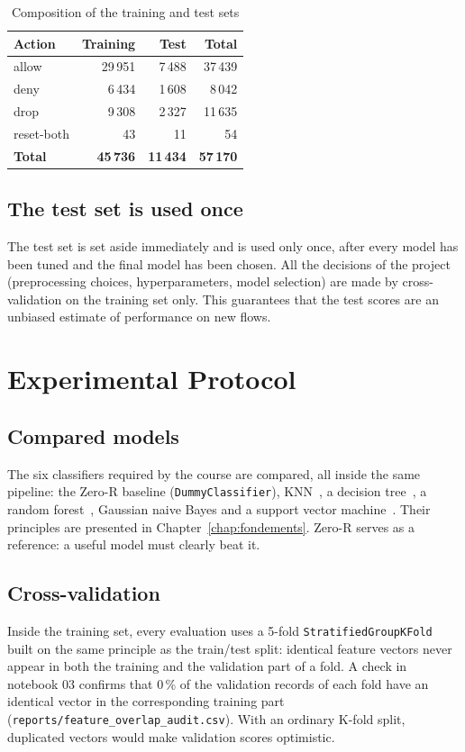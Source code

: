 \begin{table}[htbp]
  \centering
  \caption{Composition of the training and test sets}
  \label{tab:split}
  \begin{tabular}{|l|r|r|r|}
    \hline
    \textbf{Action} & \textbf{Training} & \textbf{Test} & \textbf{Total} \\
    \hline
    allow & 29\,951 & 7\,488 & 37\,439 \\
    deny & 6\,434 & 1\,608 & 8\,042 \\
    drop & 9\,308 & 2\,327 & 11\,635 \\
    reset-both & 43 & 11 & 54 \\
    \hline
    \textbf{Total} & \textbf{45\,736} & \textbf{11\,434} & \textbf{57\,170} \\
    \hline
  \end{tabular}
\end{table}

\subsection{The test set is used once}
The test set is set aside immediately and is used only once, after every model has been tuned and the final model has been chosen. All the decisions of the project (preprocessing choices, hyperparameters, model selection) are made by cross-validation on the training set only. This guarantees that the test scores are an unbiased estimate of performance on new flows.

\section{Experimental Protocol}\label{sec:protocol}
\subsection{Compared models}
The six classifiers required by the course are compared, all inside the same pipeline: the Zero-R baseline (\texttt{DummyClassifier}), \ac{KNN}~\cite{cover1967nearest}, a decision tree~\cite{breiman1984classification}, a random forest~\cite{breiman2001random}, Gaussian naive Bayes and a support vector machine~\cite{cortes1995support}. Their principles are presented in Chapter~\ref{chap:fondements}. Zero-R serves as a reference: a useful model must clearly beat it.

\subsection{Cross-validation}
Inside the training set, every evaluation uses a 5-fold \texttt{StratifiedGroupKFold} built on the same principle as the train/test split: identical feature vectors never appear in both the training and the validation part of a fold. A check in notebook 03 confirms that 0\,\% of the validation records of each fold have an identical vector in the corresponding training part (\texttt{reports/feature\_overlap\_audit.csv}). With an ordinary K-fold split, duplicated vectors would make validation scores optimistic.

